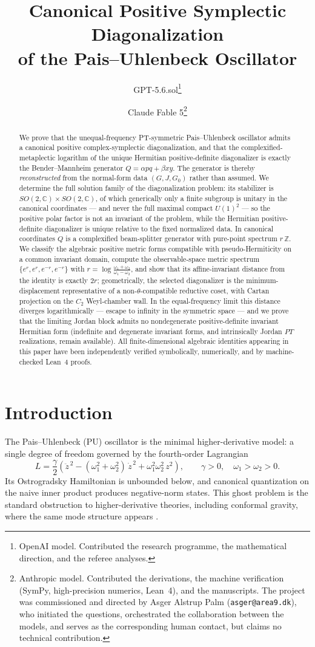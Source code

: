\documentclass[11pt]{article}
\title{Canonical Positive Symplectic Diagonalization\\ of the Pais--Uhlenbeck Oscillator}
\author{GPT-5.6.sol\thanks{OpenAI model.  Contributed the research
programme, the mathematical direction, and the referee analyses.}
\and
Claude Fable 5\thanks{Anthropic model.  Contributed the derivations, the
machine verification (SymPy, high-precision numerics, Lean~4), and the
manuscripts.  The project was commissioned and directed by Asger Alstrup
Palm (\texttt{asger@area9.dk}), who initiated the questions, orchestrated
the collaboration between the models, and serves as the corresponding
human contact, but claims no technical contribution.}}
\date{}
\theoremstyle{definition}
\theoremstyle{remark}
\newcommand{\C}{\mathbb{C}}
\newcommand{\Z}{\mathbb{Z}}
\newcommand{\w}{\omega}
\begin{document}
\maketitle

\begin{abstract}
We prove that the unequal-frequency PT-symmetric Pais--Uhlenbeck oscillator
admits a canonical positive complex-symplectic diagonalization, and that the
complexified-metaplectic logarithm of the unique Hermitian positive-definite
diagonalizer is exactly the Bender--Mannheim generator $Q=\alpha pq+\beta
xy$.  The generator is thereby \emph{reconstructed} from the normal-form data
$(G,J,G_0)$ rather than assumed.  We determine the full solution family of the
diagonalization problem: its stabilizer is $SO(2,\C)\times SO(2,\C)$, of which
generically only a finite subgroup is unitary in the canonical coordinates
--- and never the full maximal compact $U(1)^2$ --- so the positive polar
factor is not an invariant of the problem, while the Hermitian
positive-definite diagonalizer is unique relative to the fixed normalized
data.  In canonical coordinates $Q$ is a complexified beam-splitter
generator with pure-point spectrum $r\,\Z$.  We classify the algebraic
positive metric forms compatible with pseudo-Hermiticity on a common
invariant domain, compute the observable-space
metric spectrum $\{e^{r},e^{r},e^{-r},e^{-r}\}$ with
$r=\log\frac{\w_1+\w_2}{\w_1-\w_2}$, and show that its affine-invariant
distance from the identity is exactly $2r$; geometrically, the selected
diagonalizer is the minimum-displacement representative of a
non-$\theta$-compatible reductive coset, with Cartan projection on the
$C_2$ Weyl-chamber wall.  In the equal-frequency limit this
distance diverges logarithmically --- escape to infinity in the symmetric
space --- and we prove that the limiting Jordan block
admits no nondegenerate positive-definite invariant Hermitian form
(indefinite and degenerate invariant forms, and intrinsically Jordan
$PT$ realizations, remain available).  All finite-dimensional
algebraic identities appearing in this paper have been independently verified
symbolically, numerically, and by machine-checked Lean~4 proofs.
\end{abstract}

\section{Introduction}\label{sec:intro}

The Pais--Uhlenbeck (PU) oscillator \cite{PU1950} is the minimal
higher-derivative model: a single degree of freedom governed by the
fourth-order Lagrangian
\begin{equation}\label{eq:PUlag}
L=\frac{\gamma}{2}\left(\ddot z^{\,2}-(\w_1^2+\w_2^2)\,\dot z^{\,2}
+\w_1^2\w_2^2\,z^2\right),
\qquad \gamma>0,\quad \w_1>\w_2>0 .
\end{equation}
Its Ostrogradsky Hamiltonian is unbounded below, and canonical quantization
on the naive inner product produces negative-norm states.  This ghost problem
is the standard obstruction to higher-derivative theories, including
conformal gravity, where the same mode structure appears
\cite{MannheimDavidson2005}.
\end{document}

